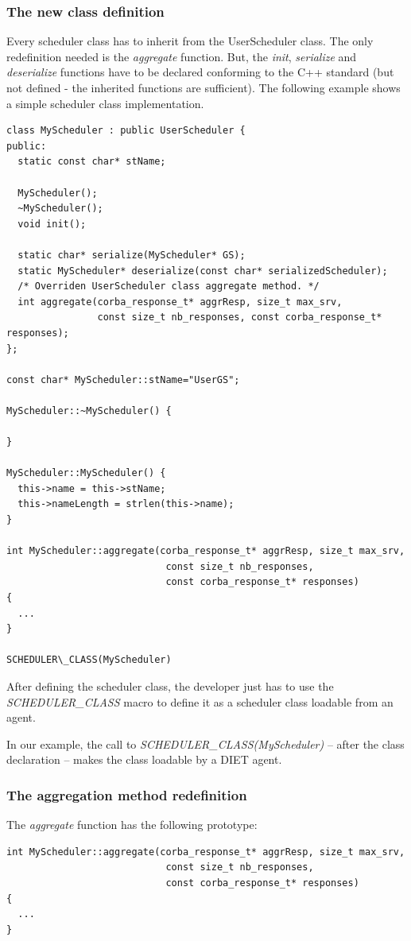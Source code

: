 \subsubsection{The new class definition}
Every scheduler class has to inherit from the UserScheduler class. The only
redefinition needed is the \textit{aggregate} function. But, the \textit{init},
\textit{serialize} and \textit{deserialize} functions have to be declared
conforming to the C++ standard (but not defined - the inherited functions are
sufficient). The following example shows a simple scheduler class
implementation.
\begin{verbatim}
class MyScheduler : public UserScheduler {
public:
  static const char* stName;

  MyScheduler();
  ~MyScheduler();
  void init();

  static char* serialize(MyScheduler* GS);
  static MyScheduler* deserialize(const char* serializedScheduler);
  /* Overriden UserScheduler class aggregate method. */
  int aggregate(corba_response_t* aggrResp, size_t max_srv,
                const size_t nb_responses, const corba_response_t* responses);
};

const char* MyScheduler::stName="UserGS";

MyScheduler::~MyScheduler() {

}

MyScheduler::MyScheduler() {
  this->name = this->stName;
  this->nameLength = strlen(this->name);
}

int MyScheduler::aggregate(corba_response_t* aggrResp, size_t max_srv,
                            const size_t nb_responses,
                            const corba_response_t* responses)
{
  ...
}

SCHEDULER\_CLASS(MyScheduler)
\end{verbatim}
After defining the scheduler class, the developer just has to use the
\textit{SCHEDULER\_CLASS} macro to define it as a scheduler class loadable
from an agent.

In our example, the call to \textit{SCHEDULER\_CLASS(MyScheduler)} --
after the class declaration -- makes the class loadable by a DIET agent.

\subsubsection{The aggregation method redefinition}
The \textit{aggregate} function has the following prototype:
\begin{verbatim}
int MyScheduler::aggregate(corba_response_t* aggrResp, size_t max_srv,
                            const size_t nb_responses,
                            const corba_response_t* responses)
{
  ...
}
\end{verbatim}

